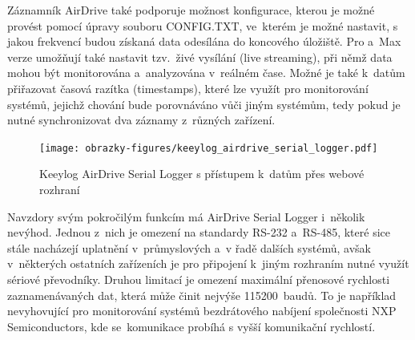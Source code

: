 Záznamník AirDrive také podporuje možnost konfigurace, kterou je možné provést pomocí úpravy souboru CONFIG.TXT, ve~kterém je možné nastavit, s jakou frekvencí budou získaná data odesílána do koncového úložiště. Pro a~Max verze umožňují také nastavit tzv.~živé vysílání (live streaming), při němž data mohou být monitorována a~analyzována v~reálném čase. Možné je také k~datům přiřazovat časová razítka (timestamps), které lze využít pro monitorování systémů, jejichž chování bude porovnáváno vůči jiným systémům, tedy pokud je nutné synchronizovat dva záznamy z~různých zařízení.~\cite{keelog_airdrive_serial_datalogger}

\newpage

\begin{figure}[h]
    \centering
    \texttt{[image: obrazky-figures/keeylog\_airdrive\_serial\_logger.pdf]}
    
    \caption{Keeylog AirDrive Serial Logger s přístupem k~datům přes webové rozhraní~\cite{keelog_airdrive_serial_datalogger, keelog_airdrive_serial_datalogger_scheme}}
    \label{fig:keelog-airdrive-serial-datalogger}
\end{figure}

Navzdory svým pokročilým funkcím má AirDrive Serial Logger i~několik nevýhod. Jednou z~nich je omezení na standardy RS-232 a~RS-485, které sice stále nacházejí uplatnění v~průmyslových a~v řadě dalších systémů, avšak v~některých ostatních zařízeních je pro připojení k~jiným rozhraním nutné využít sériové převodníky. Druhou limitací je omezení maximální přenosové rychlosti zaznamenávaných dat, která může činit nejvýše 115200~baudů. To je například nevyhovující pro monitorování systémů bezdrátového nabíjení společnosti NXP Semiconductors, kde se~komunikace probíhá s vyšší komunikační rychlostí.~\cite{keelog_airdrive_serial_datalogger}

\newpage

